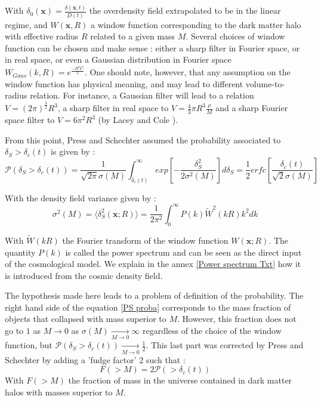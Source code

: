 With $\delta_0(\textbf{x}) = \frac{\delta(\textbf{x},t)}{D(t)}$ the overdensity field extrapolated to be in the linear regime, and $W(\textbf{x},R)$ a window function corresponding to the dark matter halo with effective radius $R$ related to a given mass $M$. Several choices of window function can be chosen and make sense : either a sharp filter in Fourier space, or in real space, or even a Gaussian distribution in Fourier space $W_{Gaus} (k,R) = e^{\frac{-R^2 k^2}{2}}$.
One should note, however, that any assumption on the window function has physical meaning, and may lead to different volume-to-radius relation\cite{Maggiore}. For instance, a Gaussian filter will lead to a relation $V = (2\pi)^{\frac{3}{2}} R^3$, a sharp filter in real space to $V = \frac{4}{3}\pi R^3 \frac{\rho}{M}$ and a sharp Fourier space filter to $V = 6 \pi^2 R^3$ (by Lacey and Cole \cite{LaC}).

From this point, Press and Schechter assumed the probability associated to $\delta_S > \delta_c (t)$ is given by :
\begin{equation}
\label{PS proba}
\mathcal{P}(\delta_S > \delta_c (t)) = \frac{1}{\sqrt{2\pi}\sigma(M)} \int^\infty_{\delta_c(t)} exp\left[ - \frac{\delta_S^2}{2\sigma^2(M)}\right] d\delta_S = \frac{1}{2} erfc \left[ \frac{\delta_c(t)}{\sqrt{2}\sigma(M)} \right]
\end{equation}

With the density field variance given by :
\begin{equation}
\label{Var}
\sigma^2(M) = \langle \delta_S^2(\textbf{x};R)\rangle = \frac{1}{2\pi^2} \int_0^\infty P(k) \widetilde{W}^2(kR) k^2 dk
\end{equation}

With $\widetilde{W}(kR)$ the Fourier transform of the window function $W(\textbf{x};R)$. The quantity $P(k)$ is called the power spectrum and can be seen as the direct input of the cosmological model. We explain in the annex \ref{Power spectrum Txt} how it is introduced from the cosmic density field.

The hypothesis made here leads to a problem of definition of the probability. The right hand side of the equation \ref{PS proba} corresponds to the mass fraction of objects that collapsed with mass superior to $M$. However, this fraction does not go to $1$ as $M \rightarrow 0$ as $\sigma(M) \xrightarrow[M \to 0]{} \infty$ regardless of the choice of the window function, but $\mathcal{P}(\delta_S > \delta_c (t)) \xrightarrow[M \to 0]{} \frac{1}{2}$. This last part was corrected by Press and Schechter by adding a 'fudge factor' 2 such that :
\begin{equation}
\label{Fudge}
F(>M) = 2 \mathcal{P}(> \delta_c (t))
\end{equation}
With $F(>M)$ the fraction of mass in the universe contained in dark matter halos with masses superior to $M$.

